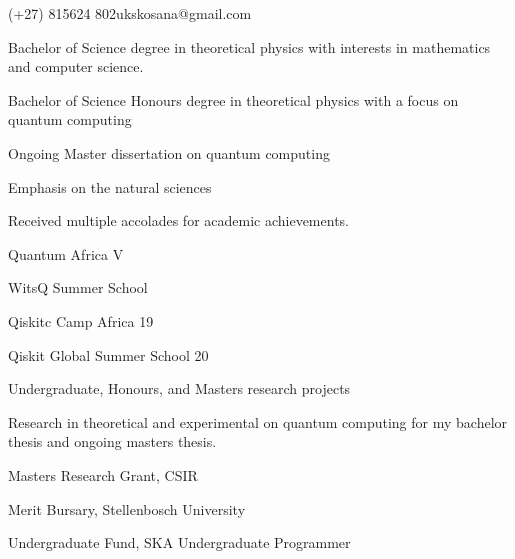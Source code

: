 \documentclass{edelgas-resume}
\begin{document}
    \namehead %
    \address{Banghoek Rd \& Bosman St, Stellenbosch, South Africa}{(+27) 815624 802}{ukskosana@gmail.com} %


    \begin{position}{}{}
        \item Bachelor of Science degree in theoretical physics with interests
            in mathematics and computer science.
        \item Bachelor of Science Honours degree in theoretical physics with
            a focus on quantum computing
        \item Ongoing Master dissertation on quantum computing
    \end{position}

    \begin{position}{}{}
        \item Emphasis on the natural sciences
        \item Received multiple accolades for academic achievements.
    \end{position}


    \begin{position}{}{}
        \item Quantum Africa V
        \item WitsQ Summer School 
        \item Qiskitc Camp Africa 19
        \item Qiskit Global Summer School 20
    \end{position}


    \begin{position}{Undergraduate, Honours, and Masters research projects}{} 
        \item Research in theoretical and experimental on quantum computing
            for my bachelor thesis and ongoing masters thesis.
    \end{position}


    \begin{position}{}{}
        \item Masters Research Grant, CSIR
        \item Merit Bursary, Stellenbosch University
        \item Undergraduate Fund, SKA Undergraduate Programmer
    \end{position}
\end{document}
